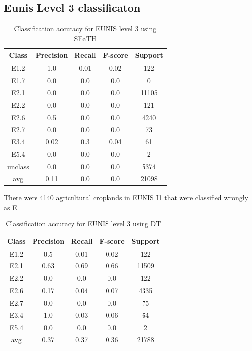 \documentclass[authoryear, review,12pt,number]{elsarticle}
\begin{document}
\subsection{Eunis Level 3 classificaton}
\begin{table}
\centering
\begin{tabular}{c c c c c}
Class & Precision & Recall & F-score & Support\\
\hline
E1.2 & 1.0 & 0.01 & 0.02 & 122\\
E1.7 & 0.0 & 0.0 & 0.0 & 0\\
E2.1 & 0.0 & 0.0 & 0.0 & 11105\\
E2.2 & 0.0 & 0.0 & 0.0 & 121\\
E2.6 & 0.5 & 0.0 & 0.0 & 4240\\
E2.7 & 0.0 & 0.0 & 0.0 & 73\\
E3.4 & 0.02 & 0.3 & 0.04 & 61\\
E5.4 & 0.0 & 0.0 & 0.0 & 2\\
unclass & 0.0 & 0.0 & 0.0 & 5374\\
avg & 0.11 & 0.0 & 0.0 & 21098\\
\end{tabular}
\caption{Classification accuracy for EUNIS level 3 using SEaTH}
\end{table}
There were 4140 agricultural croplands in EUNIS I1 that were classified wrongly 
as E 
\begin{table}
\centering
\begin{tabular}{c c c c c}
Class & Precision & Recall & F-score & Support\\
\hline
E1.2 & 0.5 & 0.01 & 0.02 & 122\\
E2.1 & 0.63 & 0.69 & 0.66 & 11509\\
E2.2 & 0.0 & 0.0 & 0.0 & 122\\
E2.6 & 0.17 & 0.04 & 0.07 & 4335\\
E2.7 & 0.0 & 0.0 & 0.0 & 75\\
E3.4 & 1.0 & 0.03 & 0.06 & 64\\
E5.4 & 0.0 & 0.0 & 0.0 & 2\\
avg & 0.37 & 0.37 & 0.36 & 21788\\
\end{tabular}
\caption{Classification accuracy for EUNIS level 3 using DT}
\end{table}
\end{document}
